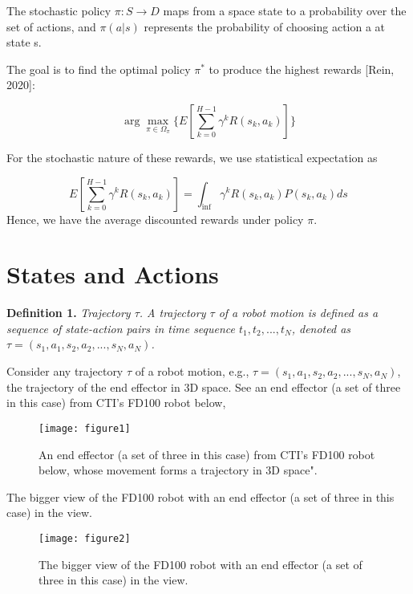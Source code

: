 \documentclass[conference]{IEEEtran}
\begin{document}
The stochastic policy $\pi  : S \rightarrow D$ maps from a 
space state to a probability over the set of actions, 
and $\pi  ( a | s )$ represents the probability
of choosing action a at state s. 

The goal is to find the optimal policy
$\pi^*$ to produce the highest rewards  [Rein, 2020]:

\begin{equation} 
\arg\max_{\pi \in {\Omega}_{\pi}} 
\{ 
E 
[ \displaystyle\sum_{k=0}^{H-1} {\gamma}^k R (s_k, a_k) ] 
\} 
\end{equation}

For the stochastic nature of these rewards, we use
statistical expectation as

\begin{equation}  
E [ \sum_{k=0}^{H-1} {\gamma}^k R (s_k, a_k) ]  
=
\int_{\inf}  {\gamma}^k R (s_k, a_k) P(s_k, a_k) ds 
\end{equation}   
Hence, we have the average discounted 
rewards under policy $\pi$.    

\section{States and Actions}
\textbf{Definition 1.} 
\textit{Trajectory $\tau$. 
A trajectory $\tau$ of a robot motion is defined as 
a sequence of state-action pairs in time sequence 
$t_1, t_2, ..., t_N$, denoted as 
$\tau = (s_1,a_1,s_2,a_2,...,s_N,a_N)$. 
} 
 
Consider any trajectory $\tau$ of a robot motion, e.g.,
$\tau = (s_1,a_1,s_2,a_2,...,s_N,a_N)$, 
the trajectory of the end effector in 3D space. 
See an end effector 
(a set of three in this case) from CTI's FD100 robot below, 

\begin{figure}[H] 
\centering
\texttt{[image: figure1]} %
\caption{An end effector 
(a set of three in this case) from CTI's FD100 robot below, whose
movement forms a trajectory in 3D space". }
\label{fig1} 
\end{figure} 
 
The bigger view of the FD100 robot with an end effector 
(a set of three in this case) in the view. 
\begin{figure}[H] 
\centering
\texttt{[image: figure2]} %
\caption{The bigger view of the FD100 robot with an end effector 
(a set of three in this case) in the view.}
\label{fig2} 
\end{figure}
\end{document}
